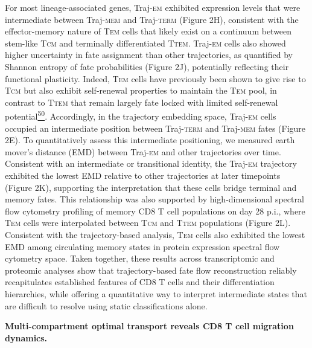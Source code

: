 For most lineage-associated genes, Traj-\textsc{em} exhibited expression
levels that were intermediate between Traj-\textsc{mem} and
Traj-\textsc{term} (Figure 2H), consistent with the effector-memory
nature of T\textsc{em} cells that likely exist on a continuum between
stem-like T\textsc{cm} and terminally differentiated T\textsc{tem}.
Traj-\textsc{em} cells also showed higher uncertainty in fate assignment
than other trajectories, as quantified by Shannon entropy of fate
probabilities (Figure 2J), potentially reflecting their functional
plasticity. Indeed, T\textsc{em} cells have previously been shown to
give rise to T\textsc{cm} but also exhibit self-renewal properties to
maintain the T\textsc{em} pool, in contrast to T\textsc{tem} that remain
largely fate locked with limited self-renewal
potential\href{https://sciwheel.com/work/citation?ids=9725107\&pre=\&suf=\&sa=0\&dbf=0}{\textsuperscript{50}}.
Accordingly, in the trajectory embedding space, Traj-\textsc{em} cells
occupied an intermediate position between Traj-\textsc{term} and
Traj-\textsc{mem} fates (Figure 2E). To quantitatively assess this
intermediate positioning, we measured earth mover's distance (EMD)
between Traj-\textsc{em} and other trajectories over time. Consistent
with an intermediate or transitional identity, the Traj-\textsc{em}
trajectory exhibited the lowest EMD relative to other trajectories at
later timepoints (Figure 2K), supporting the interpretation that these
cells bridge terminal and memory fates. This relationship was also
supported by high-dimensional spectral flow cytometry profiling of
memory CD8 T cell populations on day 28 p.i., where T\textsc{em} cells
were interpolated between T\textsc{cm} and T\textsc{tem} populations
(Figure 2L). Consistent with the trajectory-based analysis, T\textsc{em}
cells also exhibited the lowest EMD among circulating memory states in
protein expression spectral flow cytometry space. Taken together, these
results across transcriptomic and proteomic analyses show that
trajectory-based fate flow reconstruction reliably recapitulates
established features of CD8 T cells and their differentiation
hierarchies, while offering a quantitative way to interpret intermediate
states that are difficult to resolve using static classifications alone.

\textbf{Multi-compartment optimal transport reveals CD8 T cell migration
dynamics.}

